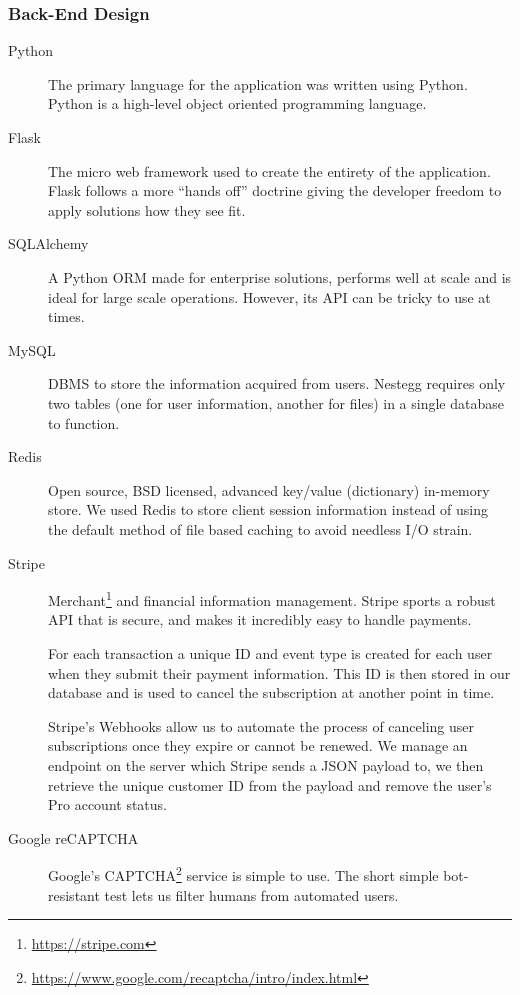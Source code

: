 \documentclass[11pt]{article}
\begin{document}
			\subsubsection{Back-End Design}
				\begin{description}
					\item[Python] The primary language for the application was written using Python. Python is a high-level object oriented programming language.
					\item[Flask] The micro web framework used to create the entirety of the application. Flask follows a more ``hands off'' doctrine giving the developer freedom to apply solutions how they see fit.
					\item[SQLAlchemy] A Python ORM made for enterprise solutions, performs well at scale and is ideal for large scale operations. However, its API can be tricky to use at times.
					\item[MySQL] DBMS to store the information acquired from users. Nestegg requires only two tables (one for user information, another for files) in a single database to function.
					\item[Redis] Open source, BSD licensed, advanced key/value (dictionary) in-memory store. We used Redis to store client session information instead of using the default method of file based caching to avoid needless I/O strain.
					\item[Stripe] Merchant\footnote{\url{https://stripe.com}} and financial information management. Stripe sports a robust API that is secure, and makes it incredibly easy to handle payments.\par For each transaction a unique ID and event type is created for each user when they submit their payment information. This ID is then stored in our database and is used to cancel the subscription at another point in time.\par Stripe's Webhooks allow us to automate the process of canceling user subscriptions once they expire or cannot be renewed. We manage an endpoint on the server which Stripe sends a JSON payload to, we then retrieve the unique customer ID from the payload and remove the user's Pro account status.
					\item[Google reCAPTCHA] Google's CAPTCHA\footnote{\url{https://www.google.com/recaptcha/intro/index.html}} service is simple to use. The short simple bot-resistant test lets us filter humans from automated users.
				\end{description}
				
\end{document}
